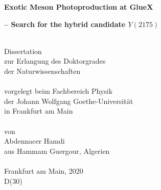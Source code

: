 \begin{titlepage}
\thispagestyle{empty}

\begin{center}
{\LARGE\bf Exotic Meson Photoproduction at GlueX}
\par
{\Large\bf -- Search for the hybrid candidate $Y(2175)$}
\par
\mbox{}\\[1.5cm]
{\large Dissertation\\
zur Erlangung des Doktorgrades\\
der Naturwissenschaften}\\
\mbox{}\\[1.5cm]
{\large vorgelegt beim Fachbereich Physik\\
der Johann Wolfgang Goethe-Universit\"at \\
in Frankfurt am Main}\\
\mbox{}\\[1.5cm]
{\large von}\\
\vspace{3mm}
{\large Abdennacer Hamdi}\\
{\large aus Hammam Guergour, Algerien}\\
\mbox{}\\[1.5cm]
{\large Frankfurt am Main, 2020}\\
\vspace{4mm}
{\large D(30)}
\end{center}

\newpage
\thispagestyle{empty}
\end{titlepage}


